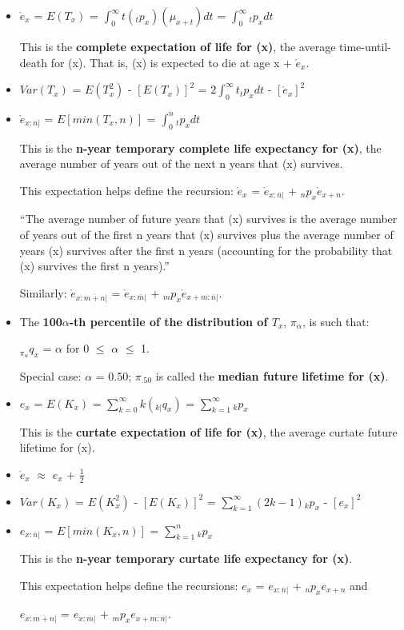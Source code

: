 \documentclass[]{book}
\begin{document}
\begin{itemize}
\item
  \(\mathring{e}_x\) = \(E(T_x)\) =
  \(\int^{\infty}_0 t({}_{t}p_x)(\mu_{x + t})dt\) =
  \(\int^{\infty}_0 {}_{t}p_xdt\)

  This is the \textbf{complete expectation of life for (x)}, the average
  time-until-death for (x). That is, (x) is expected to die at age x +
  \(\mathring{e}_x\).
\item
  \(Var(T_x)\) = \(E(T_x^2)\) - \([E(T_x)]^2\) =
  \(2\int^{\infty}_0 t{}_{t}p_xdt\) - \([\mathring{e}_x]^2\)
\item
  \(\mathring{e}_{x :\overline{n}|}\) = \(E[min(T_x, n)]\) =
  \(\int^{n}_0 {}_{t}p_xdt\)

  This is the \textbf{n-year temporary complete life expectancy for
  (x)}, the average number of years out of the next n years that (x)
  survives.

  This expectation helps define the recursion: \(\mathring{e}_x\) =
  \(\mathring{e}_{x :\overline{n}|}\) +
  \({}_{n}p_x\)\(\mathring{e}_{x + n}\).

  ``The average number of future years that (x) survives is the average
  number of years out of the first n years that (x) survives plus the
  average number of years (x) survives after the first n years
  (accounting for the probability that (x) survives the first n
  years).''

  Similarly: \(\mathring{e}_{x :\overline{m + n}|}\) =
  \(\mathring{e}_{x :\overline{m}|}\) +
  \({}_{m}p_x\)\(\mathring{e}_{x + m :\overline{n}|}\).
\item
  The \textbf{100\(\alpha\)-th percentile of the distribution of
  \(T_x\)}, \(\pi_{\alpha}\), is such that:

  \({}_{\pi_{\alpha}}q_x\) = \(\alpha\) for 0 \(\le\) \(\alpha\) \(\le\)
  1.

  Special case: \(\alpha\) = 0.50; \(\pi_{.50}\) is called the
  \textbf{median future lifetime for (x)}.
\end{itemize}

\begin{itemize}
\item
  \(e_x\) = \(E(K_x)\) = \(\sum^{\infty}_{k = 0} k({}_{k|}q_x)\) =
  \(\sum^{\infty}_{k = 1} {}_{k}p_x\)

  This is the \textbf{curtate expectation of life for (x)}, the average
  curtate future lifetime for (x).
\item
  \(\mathring{e}_x\) \(\approx\) \(e_x\) + \(\frac{1}{2}\)
\item
  \(Var(K_x)\) = \(E(K_x^2)\) - \([E(K_x)]^2\) =
  \(\sum^{\infty}_{k = 1} (2k - 1){}_{k}p_x\) - \([e_x]^2\)
\item
  \(e_{x :\overline{n}|}\) = \(E[min(K_x, n)]\) =
  \(\sum^{n}_{k = 1} {}_{k}p_x\)

  This is the \textbf{n-year temporary curtate life expectancy for (x)}.

  This expectation helps define the recursions: \(e_x\) =
  \(e_{x :\overline{n}|}\) + \({}_{n}p_x\)\(e_{x + n}\) and

  \(e_{x :\overline{m + n}|}\) = \(e_{x :\overline{m}|}\) +
  \({}_{m}p_x\)\(e_{x + m :\overline{n}|}\).
\end{itemize}
\end{document}
